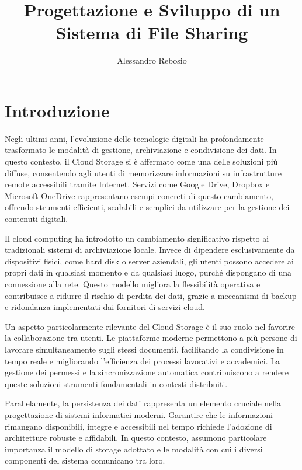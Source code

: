 \documentclass[12pt,a4paper]{report}
\begin{document}
\title{Progettazione e Sviluppo di un Sistema di File Sharing}
\author{Alessandro Rebosio}

\maketitle


\chapter*{Introduzione}
\label{chap:introduzione}
Negli ultimi anni, l'evoluzione delle tecnologie digitali ha
profondamente trasformato le modalità di gestione, archiviazione e
condivisione dei dati. In questo contesto, il Cloud Storage si è
affermato come una delle soluzioni più diffuse, consentendo agli
utenti di memorizzare informazioni su infrastrutture remote
accessibili tramite Internet. Servizi come Google Drive, Dropbox e
Microsoft OneDrive rappresentano esempi concreti di questo cambiamento,
offrendo strumenti efficienti, scalabili e semplici da utilizzare per
la gestione dei contenuti digitali.

Il cloud computing ha introdotto un cambiamento significativo
rispetto ai tradizionali sistemi di archiviazione locale. Invece di
dipendere esclusivamente da dispositivi fisici, come hard disk o
server aziendali, gli utenti possono accedere ai propri dati in
qualsiasi momento e da qualsiasi luogo, purché dispongano di una
connessione alla rete. Questo modello migliora la flessibilità
operativa e contribuisce a ridurre il rischio di perdita dei dati,
grazie a meccanismi di backup e ridondanza implementati dai fornitori
di servizi cloud.

Un aspetto particolarmente rilevante del Cloud Storage è il suo ruolo
nel favorire la collaborazione tra utenti. Le piattaforme moderne
permettono a più persone di lavorare simultaneamente sugli stessi
documenti, facilitando la condivisione in tempo reale e migliorando
l'efficienza dei processi lavorativi e accademici. La gestione dei
permessi e la sincronizzazione automatica contribuiscono a rendere
queste soluzioni strumenti fondamentali in contesti distribuiti.

Parallelamente, la persistenza dei dati rappresenta un elemento
cruciale nella progettazione di sistemi informatici moderni. Garantire
che le informazioni rimangano disponibili, integre e accessibili nel
tempo richiede l'adozione di architetture robuste e affidabili. In
questo contesto, assumono particolare importanza il modello di
storage adottato e le modalità con cui i diversi componenti del
sistema comunicano tra loro.
\end{document}
